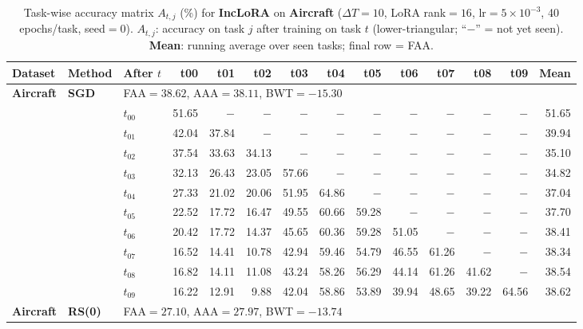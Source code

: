 \begin{table}[ht]
\centering
\caption{%
  Task-wise accuracy matrix $A_{t,j}$ (\%) for \textbf{IncLoRA} on \textbf{Aircraft} ($\Delta T=10$, LoRA rank$=16$, lr$=5\times10^{-3}$, 40 epochs/task, seed$=0$).
  $A_{t,j}$: accuracy on task $j$ after training on task $t$  (lower-triangular; ``$-$'' = not yet seen).
  \textbf{Mean}: running average over seen tasks; final row = FAA.
}
\label{tab:raw_inclora_aircraft}
\setlength{\tabcolsep}{2.8pt}
\renewcommand{\arraystretch}{0.88}
\scriptsize
\begin{tabular}{@{}l l l *{11}{r}@{}}
\toprule
\textbf{Dataset} & \textbf{Method} & \textbf{After $t$} & \textbf{t00} & \textbf{t01} & \textbf{t02} & \textbf{t03} & \textbf{t04} & \textbf{t05} & \textbf{t06} & \textbf{t07} & \textbf{t08} & \textbf{t09} & \textbf{Mean} \\
\midrule
\multirow{11}{*}{\textbf{Aircraft}} & \multirow{11}{*}{\textbf{SGD}} & \multicolumn{12}{l}{\quad\small FAA$=38.62$,\; AAA$=38.11$,\; BWT$=-15.30$} \\
 & & $t_{00}$ & 51.65 & $-$ & $-$ & $-$ & $-$ & $-$ & $-$ & $-$ & $-$ & $-$ & 51.65 \\
 & & $t_{01}$ & 42.04 & 37.84 & $-$ & $-$ & $-$ & $-$ & $-$ & $-$ & $-$ & $-$ & 39.94 \\
 & & $t_{02}$ & 37.54 & 33.63 & 34.13 & $-$ & $-$ & $-$ & $-$ & $-$ & $-$ & $-$ & 35.10 \\
 & & $t_{03}$ & 32.13 & 26.43 & 23.05 & 57.66 & $-$ & $-$ & $-$ & $-$ & $-$ & $-$ & 34.82 \\
 & & $t_{04}$ & 27.33 & 21.02 & 20.06 & 51.95 & 64.86 & $-$ & $-$ & $-$ & $-$ & $-$ & 37.04 \\
 & & $t_{05}$ & 22.52 & 17.72 & 16.47 & 49.55 & 60.66 & 59.28 & $-$ & $-$ & $-$ & $-$ & 37.70 \\
 & & $t_{06}$ & 20.42 & 17.72 & 14.37 & 45.65 & 60.36 & 59.28 & 51.05 & $-$ & $-$ & $-$ & 38.41 \\
 & & $t_{07}$ & 16.52 & 14.41 & 10.78 & 42.94 & 59.46 & 54.79 & 46.55 & 61.26 & $-$ & $-$ & 38.34 \\
 & & $t_{08}$ & 16.82 & 14.11 & 11.08 & 43.24 & 58.26 & 56.29 & 44.14 & 61.26 & 41.62 & $-$ & 38.54 \\
 & & $t_{09}$ & 16.22 & 12.91 & 9.88 & 42.04 & 58.86 & 53.89 & 39.94 & 48.65 & 39.22 & 64.56 & 38.62 \\
\midrule
\multirow{11}{*}{\textbf{Aircraft}} & \multirow{11}{*}{\textbf{RS(0)}} & \multicolumn{12}{l}{\quad\small FAA$=27.10$,\; AAA$=27.97$,\; BWT$=-13.74$} \\

\end{tabular}
\end{table}
